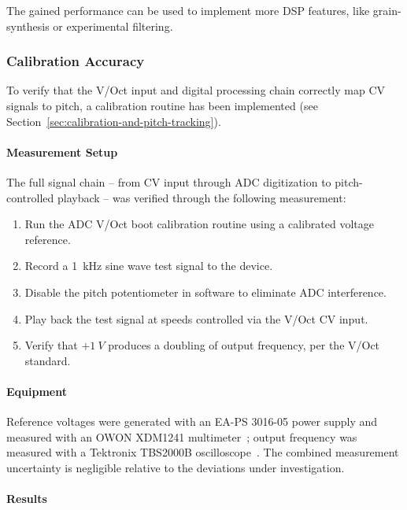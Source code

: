 The gained performance can be used to implement more DSP features, like grain-synthesis or experimental filtering.

\subsubsection{Calibration Accuracy}

To verify that the V/Oct input and digital processing chain correctly map CV signals to pitch, a calibration routine has been implemented (see Section~\ref{sec:calibration-and-pitch-tracking}).

\paragraph{Measurement Setup}

The full signal chain -- from CV input through ADC digitization to pitch-controlled playback -- was verified through the following measurement:

\begin{enumerate}
    \item Run the ADC V/Oct boot calibration routine using a calibrated voltage reference.
    \item Record a \SI{1}{kHz} sine wave test signal to the device.
    \item Disable the pitch potentiometer in software to eliminate ADC interference.
    \item Play back the test signal at speeds controlled via the V/Oct CV input.
    \item Verify that $+\SI{1}{V}$ produces a doubling of output frequency, per the V/Oct standard.
\end{enumerate}

\paragraph{Equipment}

Reference voltages were generated with an EA-PS 3016-05 power supply and measured with an OWON XDM1241 multimeter~\cite{owonXDM1000SeriesDatasheet}; output frequency was measured with a Tektronix TBS2000B oscilloscope~\cite{TBS2000BSpecificationVerification_077153803_RevD}.
The combined measurement uncertainty is negligible relative to the deviations under investigation.

\paragraph{Results}


